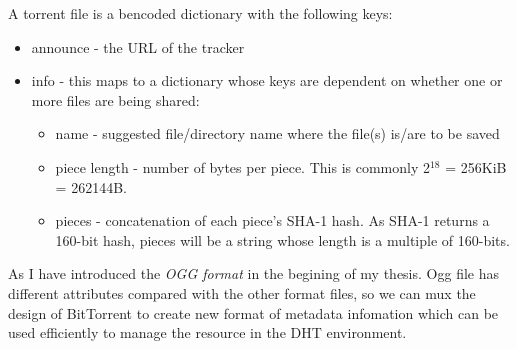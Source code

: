 {A torrent file is a bencoded dictionary with the following keys:
\begin{itemize}
\item announce - the URL of the tracker
\item info - this maps to a dictionary whose keys are dependent on whether one or more files are being shared:
\begin{itemize}
\item name - suggested file/directory name where the file(s) is/are to be saved
\item piece length - number of bytes per piece. This is commonly 2$^{18}$ = 256KiB = 262144B.
\item pieces - concatenation of each piece's SHA-1 hash. As SHA-1 returns a 160-bit hash, pieces will be a string whose length is a multiple of 160-bits.
\end{itemize}
\end{itemize}


As I have introduced the \emph{OGG format} in the begining of my thesis. 
Ogg file has different attributes compared with the other format files, so we can mux the design of BitTorrent to create new format of metadata infomation which can be used efficiently to manage the resource in the DHT environment.

}
